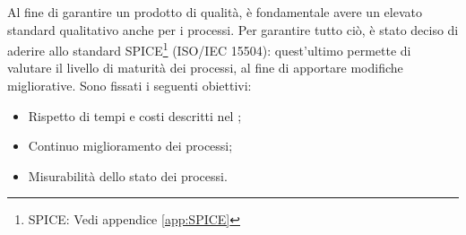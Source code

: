 Al fine di garantire un prodotto di qualità, è fondamentale avere un elevato standard qualitativo anche per i processi. Per garantire tutto ciò, è stato deciso di aderire allo standard {SPICE}\footnote{SPICE: Vedi appendice \cref{app:SPICE}} (ISO/IEC 15504): quest'ultimo permette di valutare il livello di maturità dei processi, al fine di apportare modifiche migliorative.\newline
Sono fissati i seguenti obiettivi:
\begin{itemize}
	\item Rispetto di tempi e costi descritti nel \PdP ;
	\item Continuo miglioramento dei processi;
	\item Misurabilità dello stato dei processi.
\end{itemize}
